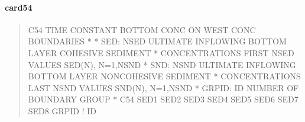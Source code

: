 \documentclass[letterpaper,10pt,english]{sphinxmanual}
\begin{document}
\paragraph{card54}
\label{\detokenize{inputfiles/runcontrol/card54:card54}}\label{\detokenize{inputfiles/runcontrol/card54::doc}}\begin{quote}

\begin{sphinxVerbatim}[commandchars=\\\{\}]
\PYGZhy{}\PYGZhy{}\PYGZhy{}\PYGZhy{}\PYGZhy{}\PYGZhy{}\PYGZhy{}\PYGZhy{}\PYGZhy{}\PYGZhy{}\PYGZhy{}\PYGZhy{}\PYGZhy{}\PYGZhy{}\PYGZhy{}\PYGZhy{}\PYGZhy{}\PYGZhy{}\PYGZhy{}\PYGZhy{}\PYGZhy{}\PYGZhy{}\PYGZhy{}\PYGZhy{}\PYGZhy{}\PYGZhy{}\PYGZhy{}\PYGZhy{}\PYGZhy{}\PYGZhy{}\PYGZhy{}\PYGZhy{}\PYGZhy{}\PYGZhy{}\PYGZhy{}\PYGZhy{}\PYGZhy{}\PYGZhy{}\PYGZhy{}\PYGZhy{}\PYGZhy{}\PYGZhy{}\PYGZhy{}\PYGZhy{}\PYGZhy{}\PYGZhy{}\PYGZhy{}\PYGZhy{}\PYGZhy{}\PYGZhy{}\PYGZhy{}\PYGZhy{}\PYGZhy{}\PYGZhy{}\PYGZhy{}\PYGZhy{}\PYGZhy{}\PYGZhy{}\PYGZhy{}\PYGZhy{}\PYGZhy{}\PYGZhy{}\PYGZhy{}\PYGZhy{}\PYGZhy{}\PYGZhy{}\PYGZhy{}\PYGZhy{}\PYGZhy{}\PYGZhy{}\PYGZhy{}\PYGZhy{}\PYGZhy{}\PYGZhy{}\PYGZhy{}\PYGZhy{}\PYGZhy{}\PYGZhy{}
C54 TIME CONSTANT BOTTOM CONC ON WEST CONC BOUNDARIES
*
*    SED: NSED ULTIMATE INFLOWING BOTTOM LAYER COHESIVE SEDIMENT
*         CONCENTRATIONS  FIRST NSED VALUES SED(N), N=1,NSND
*    SND: NSND ULTIMATE INFLOWING BOTTOM LAYER NON\PYGZhy{}COHESIVE SEDIMENT
*         CONCENTRATIONS LAST NSND VALUES SND(N), N=1,NSND
*  GRPID: ID NUMBER OF BOUNDARY GROUP
*
C54      SED1      SED2      SED3      SED4      SED5      SED6      SED7      SED8      GRPID ! ID 
\end{sphinxVerbatim}
\end{quote}
\end{document}
